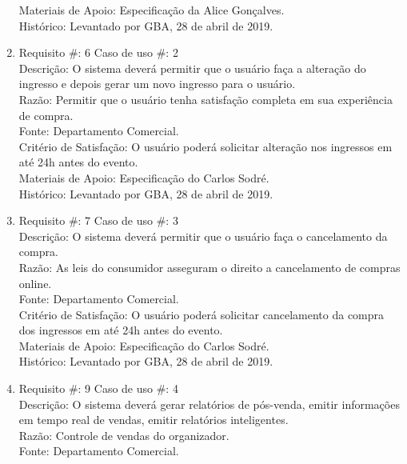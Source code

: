 \documentclass[12pt]{article}
\begin{document}
\begin{enumerate}
                    Materiais de Apoio: Especificação da Alice Gonçalves.\\
                    Histórico: Levantado por GBA, 28 de abril de 2019.\\
                \item Requisito \#: 6 Caso de uso \#: 2\\
                    Descrição:  O sistema deverá permitir que o usuário faça a alteração do ingresso e depois gerar um novo ingresso para o usuário. \\
                    Razão: Permitir que o usuário tenha satisfação completa em sua experiência de compra. \\
                    Fonte: Departamento Comercial. \\
                    Critério de Satisfação: O usuário poderá solicitar alteração nos ingressos em até 24h antes do evento. \\
                    Materiais de Apoio: Especificação do Carlos Sodré.\\
                    Histórico: Levantado por GBA, 28 de abril de 2019.\\
                \item Requisito \#: 7 Caso de uso \#: 3\\
                    Descrição: O sistema deverá permitir que o usuário faça o cancelamento da compra.\\
                    Razão: As leis do consumidor asseguram o direito a cancelamento de compras online. \\
                    Fonte: Departamento Comercial.\\
                    Critério de Satisfação: O usuário poderá solicitar cancelamento da compra dos ingressos em até 24h antes do evento. \\
                    Materiais de Apoio: Especificação do Carlos Sodré.\\
                    Histórico: Levantado por GBA, 28 de abril de 2019.\\
                \item Requisito \#: 9 Caso de uso \#: 4\\
                    Descrição: O sistema deverá gerar relatórios de pós-venda, emitir informações em tempo real de vendas, emitir relatórios inteligentes.\\
                    Razão: Controle de vendas do organizador. \\
                    Fonte: Departamento Comercial.\\

\end{enumerate}
\end{document}

